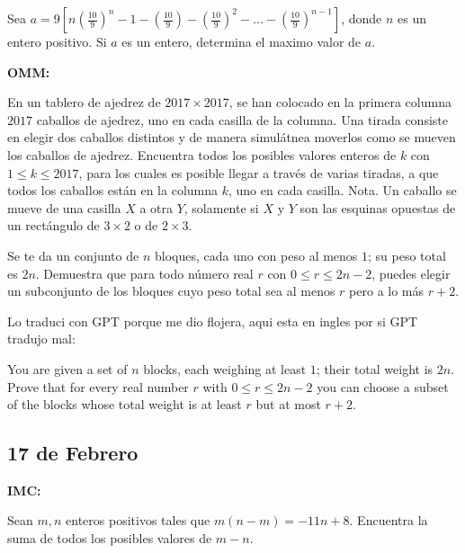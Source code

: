 \documentclass[11pt]{scrartcl}
\begin{document}
\begin{problem}  [IMC 2005/10]
    Sea $a=9 \left[ n\left( \frac{10}{9}\right)^n-1-\left( \frac{10}{9}\right)-\left( \frac{10}{9}\right)^2-\ldots-\left( \frac{10}{9}\right)^{n-1}\right]$, donde $n$ es un entero positivo. Si $a$ es un entero, determina el maximo valor de $a$.
\end{problem}

\textbf{OMM:}

\begin{problem} [OMM 2017/1]
    
    En un tablero de ajedrez de $2017 \times 2017$, se han colocado en la primera columna $2017$
caballos de ajedrez, uno en cada casilla de la columna. Una tirada consiste en elegir dos
caballos distintos y de manera simulátnea moverlos como se mueven los caballos de ajedrez.
Encuentra todos los posibles valores enteros de $k$ con $1 \leq k \leq 2017$, para los cuales es
posible llegar a través de varias tiradas, a que todos los caballos están en la columna $k$, uno
en cada casilla.
Nota. Un caballo se mueve de una casilla $X$ a otra $Y$, solamente si $X$ y $Y$ son las esquinas
opuestas de un rectángulo de $3 \times 2$ o de $2 \times 3$.
    
\end{problem}

\begin{problem} [IMOSL 2019 C2]
    Se te da un conjunto de $n$ bloques, cada uno con peso al menos $1$; su peso total es $2n$. Demuestra que para todo número real $r$ con $0 \leq r \leq 2n - 2$, puedes elegir un subconjunto de los bloques cuyo peso total sea al menos $r$ pero a lo más $r + 2$.
\end{problem}
\begin{remark*}
    Lo traduci con GPT porque me dio flojera, aqui esta en ingles por si GPT tradujo mal:
    \begin{problem*}
    You are given a set of $n$ blocks, each weighing at least $1$; their total weight is $2n$. Prove that for every real number $r$ with $0 \leq r \leq 2n-2$ you can choose a subset of the blocks whose total weight is at least $r$ but at most $r + 2$.
    \end{problem*}
\end{remark*}


\newpage
\subsection{17 de Febrero}
\textbf{IMC:}
\begin{problem} [IMC 2018/2]
    Sean $m,n$ enteros positivos tales que $m(n-m)=-11n+8$. Encuentra la suma de todos los posibles valores de $m-n$.
\end{problem}
\end{document}
